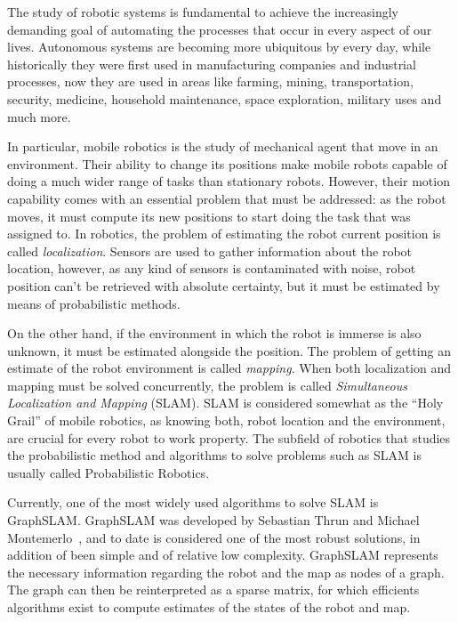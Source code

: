 The study of robotic systems is fundamental to achieve the increasingly demanding goal of automating the processes that occur in every aspect of our lives. Autonomous systems are becoming more ubiquitous by every day, while historically they were first used in manufacturing companies and industrial processes, now they are used in areas like farming, mining, transportation, security, medicine, household maintenance, space exploration, military uses and much more.

In particular, mobile robotics is the study of mechanical agent that move in an environment. Their ability to change its positions make mobile robots capable of doing a much wider range of tasks than stationary robots. However, their motion capability comes with an essential problem that must be addressed: as the robot moves, it must compute its new positions to start doing the task that was assigned to. In robotics, the problem of estimating the robot current position is called \textit{localization}. Sensors are used to gather information about the robot location, however, as any kind of sensors is contaminated with noise, robot position can't be retrieved with absolute certainty, but it must be estimated by means of probabilistic methods.  


On the other hand, if the environment in which the robot is immerse is also unknown, it must be estimated alongside the position. The problem of getting an estimate of the robot environment is called \textit{mapping}. When both localization and mapping must be solved concurrently, the problem is called \textit{Simultaneous Localization and Mapping} (SLAM). SLAM is considered somewhat as the ``Holy Grail'' of mobile robotics, as knowing both, robot location and the environment, are crucial for every robot to work property. The subfield of robotics that studies the probabilistic method and algorithms to solve problems such as SLAM is usually called Probabilistic Robotics.

Currently, one of the most widely used algorithms to solve SLAM is GraphSLAM. GraphSLAM was developed by Sebastian Thrun and Michael Montemerlo~\cite{graphslam}, and to date is considered one of the most robust solutions, in addition of been simple and of relative low complexity. GraphSLAM represents the necessary information regarding the robot and the map as nodes of a graph. The graph can then be reinterpreted as a sparse matrix, for which efficients algorithms exist to compute estimates of the states of the robot and map. 


